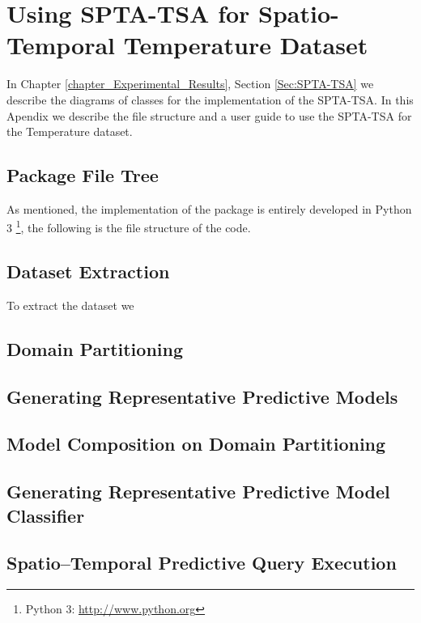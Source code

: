 \chapter{Using SPTA-TSA for Spatio-Temporal Temperature Dataset}
\label{apendiceA}

In Chapter \ref{chapter_Experimental_Results}, Section \ref{Sec:SPTA-TSA} we describe the diagrams of classes for the implementation of the SPTA-TSA. In this Apendix we describe the file structure and a user guide to use the SPTA-TSA for the Temperature dataset.

\section{Package File Tree}

As mentioned, the implementation of the package is entirely developed in Python 3 \footnote{Python 3: \url{http://www.python.org}}, the following is the file structure of the code.


\section{Dataset Extraction}

To extract the dataset we 



\section{Domain Partitioning}



\section{Generating Representative Predictive Models}


\section{Model Composition on Domain Partitioning}


\section{Generating Representative Predictive Model Classifier}


\section{Spatio--Temporal Predictive Query Execution}

